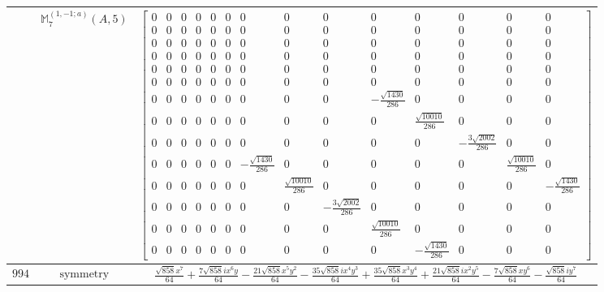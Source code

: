 \documentclass[fleqn,8pt,landscape]{jsarticle}
\begin{document}
\begin{longtable}{ccc}
$  $ & $ \mathbb{M}_{7}^{(1,-1;a)}(A,5) $ & $ \begin{bmatrix} 0 & 0 & 0 & 0 & 0 & 0 & 0 & 0 & 0 & 0 & 0 & 0 & 0 & 0 \\ 0 & 0 & 0 & 0 & 0 & 0 & 0 & 0 & 0 & 0 & 0 & 0 & 0 & 0 \\ 0 & 0 & 0 & 0 & 0 & 0 & 0 & 0 & 0 & 0 & 0 & 0 & 0 & 0 \\ 0 & 0 & 0 & 0 & 0 & 0 & 0 & 0 & 0 & 0 & 0 & 0 & 0 & 0 \\ 0 & 0 & 0 & 0 & 0 & 0 & 0 & 0 & 0 & 0 & 0 & 0 & 0 & 0 \\ 0 & 0 & 0 & 0 & 0 & 0 & 0 & 0 & 0 & 0 & 0 & 0 & 0 & 0 \\ 0 & 0 & 0 & 0 & 0 & 0 & 0 & 0 & 0 & - \frac{\sqrt{1430}}{286} & 0 & 0 & 0 & 0 \\ 0 & 0 & 0 & 0 & 0 & 0 & 0 & 0 & 0 & 0 & \frac{\sqrt{10010}}{286} & 0 & 0 & 0 \\ 0 & 0 & 0 & 0 & 0 & 0 & 0 & 0 & 0 & 0 & 0 & - \frac{3 \sqrt{2002}}{286} & 0 & 0 \\ 0 & 0 & 0 & 0 & 0 & 0 & - \frac{\sqrt{1430}}{286} & 0 & 0 & 0 & 0 & 0 & \frac{\sqrt{10010}}{286} & 0 \\ 0 & 0 & 0 & 0 & 0 & 0 & 0 & \frac{\sqrt{10010}}{286} & 0 & 0 & 0 & 0 & 0 & - \frac{\sqrt{1430}}{286} \\ 0 & 0 & 0 & 0 & 0 & 0 & 0 & 0 & - \frac{3 \sqrt{2002}}{286} & 0 & 0 & 0 & 0 & 0 \\ 0 & 0 & 0 & 0 & 0 & 0 & 0 & 0 & 0 & \frac{\sqrt{10010}}{286} & 0 & 0 & 0 & 0 \\ 0 & 0 & 0 & 0 & 0 & 0 & 0 & 0 & 0 & 0 & - \frac{\sqrt{1430}}{286} & 0 & 0 & 0 \end{bmatrix} $ \\ \hline
$ 994 $ & $ \text{symmetry} $ & $ \frac{\sqrt{858} x^{7}}{64} + \frac{7 \sqrt{858} i x^{6} y}{64} - \frac{21 \sqrt{858} x^{5} y^{2}}{64} - \frac{35 \sqrt{858} i x^{4} y^{3}}{64} + \frac{35 \sqrt{858} x^{3} y^{4}}{64} + \frac{21 \sqrt{858} i x^{2} y^{5}}{64} - \frac{7 \sqrt{858} x y^{6}}{64} - \frac{\sqrt{858} i y^{7}}{64} $ \\

\end{longtable}
\end{document}
